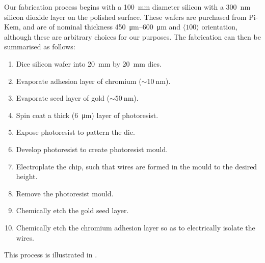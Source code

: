 Our fabrication process begins with a \SI{100}{\milli\meter} diameter silicon
with a \SI{300}{\nano\meter} silicon dioxide layer on the polished
surface.  These wafers are purchased from Pi-Kem, and are of nominal thickness
\SIrange{450}{600}{\micro\meter} and $\langle100\rangle$ orientation, although
these are arbitrary choices for our purposes. The fabrication can then be
summarised as follows:
%
\begin{enumerate}
  \item Dice silicon wafer into \SI{20}{\milli\meter} by \SI{20}{\milli\meter} dies.
  \item Evaporate adhesion layer of chromium ($\sim\SI{10}{\nano\meter}$).
  \item Evaporate seed layer of gold ($\sim\SI{50}{\nano\meter}$).
  \item Spin coat a thick (\SI{6}{\micro\meter}) layer of photoresist.
  \item Expose photoresist to pattern the die.
  \item Develop photoresist to create photoresist mould.
  \item Electroplate the chip, such that wires are formed in the mould to the desired height.
  \item Remove the photoresist mould.  
  \item Chemically etch the gold seed layer.
  \item Chemically etch the chromium adhesion layer so as to electrically isolate the wires.
\end{enumerate}
%
This process is illustrated in .

